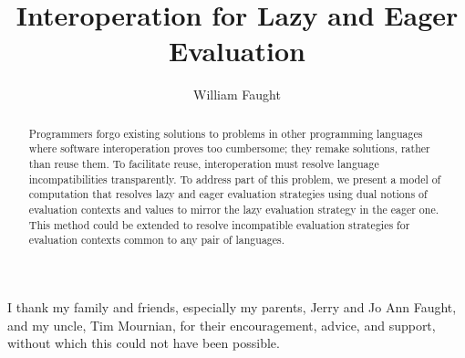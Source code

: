 \documentclass[12pt]{ucthesis}
\begin{document}
\title{Interoperation for Lazy and Eager Evaluation}
\author{William Faught}
\maketitle
\begin{frontmatter}
\copyrightpage
\approvalpage

\begin{abstract}
Programmers forgo existing solutions to problems in other programming languages where software interoperation proves too cumbersome; they remake solutions, rather than reuse them. To facilitate reuse, interoperation must resolve language incompatibilities transparently. To address part of this problem, we present a model of computation that resolves lazy and eager evaluation strategies using dual notions of evaluation contexts and values to mirror the lazy evaluation strategy in the eager one. This method could be extended to resolve incompatible evaluation strategies for evaluation contexts common to any pair of languages.
\end{abstract}

\begin{acknowledgements}
\indent\indent I thank my family and friends, especially my parents, Jerry and Jo Ann Faught, and my uncle, Tim Mournian, for their encouragement, advice, and support, without which this could not have been possible.
\end{acknowledgements}

\tableofcontents
\listoffigures
\end{frontmatter}
\pagestyle{plain}
\renewcommand{\baselinestretch}{1.66}






\clearpage



\end{document}
